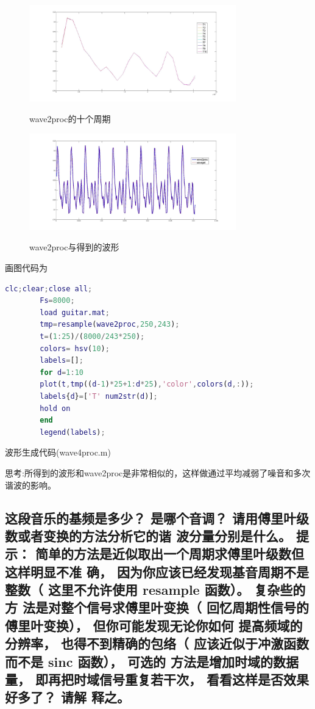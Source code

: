 \documentclass{ctexart}
\begin{document}
        \begin{figure}
            \centering
            \includegraphics[width=0.8\textwidth]{fmt/1_6_3.jpg}\\
            \caption{wave2proc的十个周期\label{163}}
        \end{figure}
        \begin{figure}
            \centering
            \includegraphics[width=0.8\textwidth]{fmt/1_6_4.jpg}\\
            \caption{wave2proc与得到的波形\label{164}}

        \end{figure}


        画图代码为
        \begin{lstlisting}[language=matlab]
        clc;clear;close all;
        Fs=8000;
        load guitar.mat;
        tmp=resample(wave2proc,250,243);
        t=(1:25)/(8000/243*250);
        colors= hsv(10);
        labels=[];
        for d=1:10
        plot(t,tmp((d-1)*25+1:d*25),'color',colors(d,:));
        labels{d}=['T' num2str(d)];
        hold on 
        end
        legend(labels);
        \end{lstlisting}

        波形生成代码(wave4proc.m)
        

        思考:所得到的波形和wave2proc是非常相似的，这样做通过平均减弱了噪音和多次谐波的影响。
    \subsection{
            这段音乐的基频是多少？ 是哪个音调？ 请用傅里叶级数或者变换的方法分析它的谐
            波分量分别是什么。 提示： 简单的方法是近似取出一个周期求傅里叶级数但这样明显不准
            确， 因为你应该已经发现基音周期不是整数（ 这里不允许使用 resample 函数）。 复杂些的方
            法是对整个信号求傅里叶变换（ 回忆周期性信号的傅里叶变换）， 但你可能发现无论你如何
            提高频域的分辨率， 也得不到精确的包络（ 应该近似于冲激函数而不是 sinc 函数）， 可选的
            方法是增加时域的数据量， 即再把时域信号重复若干次， 看看这样是否效果好多了？ 请解
            释之。
        }
\end{document}
